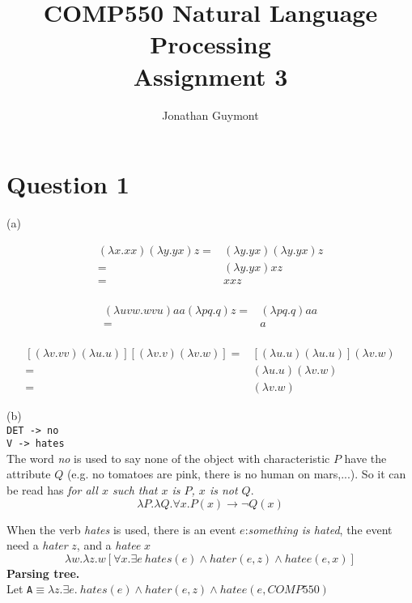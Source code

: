 \documentclass[12pt]{article}
\title{COMP550 Natural Language Processing\\Assignment 3}
\author{Jonathan Guymont}
\begin{document}
\maketitle

\section*{Question 1}

(a) 

\begin{equation}
\begin{split}
	(\lambda x. xx)(\lambda y. yx) z 
	=& (\lambda y. y x) (\lambda y. y x) z\\
	=& (\lambda y. y x) xz \\
	=& xxz \\
\end{split}
\end{equation}

\begin{equation}
\begin{split}
	(\lambda uvw.wvu)aa(\lambda pq. q) z 
	=& (\lambda pq. q) aa\\
	=& a \\
\end{split}
\end{equation}

\begin{equation}
\begin{split}
	[(\lambda v.vv)(\lambda u. u)] [(\lambda v.v)(\lambda v.w)]
	=& [(\lambda u.u)(\lambda u. u)](\lambda v.w)\\
	=&  (\lambda u.u)(\lambda v. w)\\
	=& (\lambda v. w)
\end{split}
\end{equation}

(b) \\
\texttt{DET -> no}    \\ 
\texttt{V -> hates} \\

The word \textit{no} is used to say none of the object with characteristic $P$ have the attribute $Q$ (e.g. no tomatoes are pink, there is no human on mars,...). So it can be read has \textit{for all $x$ such that $x$ is $P$, $x$ is not $Q$}.  
\[
	\lambda P. \lambda Q. \forall x. P(x) \rightarrow  \neg Q(x)
\]

When the verb \textit{hates} is used, there is an event $e$:\textit{something is hated}, the event need a \textit{hater} $z$, and a \textit{hatee} $x$
\[
	\lambda w. \lambda z. w[\forall x. \exists e~ hates(e) \land hater(e,z) \land hatee(e, x)]
\]
\textbf{Parsing tree.}\\
Let \texttt{A}$\equiv \lambda z.\exists e. ~hates(e)\land hater(e, z) \land hatee(e, COMP550)$\\
\end{document}
